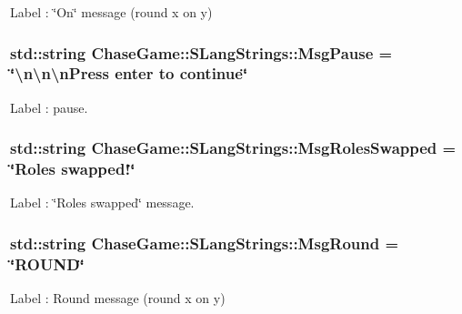 Label \-: \char`\"{}\-On\char`\"{} message (round x on y) 

\hypertarget{struct_chase_game_1_1_s_lang_strings_ad8e029116bf5c6ad81dd7e116195d5cc}{
\subsubsection[{Msg\-Pause}]{\setlength{\rightskip}{0pt plus 5cm}std\-::string Chase\-Game\-::\-S\-Lang\-Strings\-::\-Msg\-Pause = \char`\"{}\textbackslash{}n\textbackslash{}n\textbackslash{}n\-Press enter to continue\char`\"{}}}\label{struct_chase_game_1_1_s_lang_strings_ad8e029116bf5c6ad81dd7e116195d5cc}


Label \-: pause. 

\hypertarget{struct_chase_game_1_1_s_lang_strings_a7218940577aeae4cfb5f47bda05c88ce}{
\subsubsection[{Msg\-Roles\-Swapped}]{\setlength{\rightskip}{0pt plus 5cm}std\-::string Chase\-Game\-::\-S\-Lang\-Strings\-::\-Msg\-Roles\-Swapped = \char`\"{}Roles swapped!\char`\"{}}}\label{struct_chase_game_1_1_s_lang_strings_a7218940577aeae4cfb5f47bda05c88ce}


Label \-: \char`\"{}\-Roles swapped\char`\"{} message. 

\hypertarget{struct_chase_game_1_1_s_lang_strings_a637a94fa33b573cec57d98e6855c823f}{
\subsubsection[{Msg\-Round}]{\setlength{\rightskip}{0pt plus 5cm}std\-::string Chase\-Game\-::\-S\-Lang\-Strings\-::\-Msg\-Round = \char`\"{}R\-O\-U\-N\-D\char`\"{}}}\label{struct_chase_game_1_1_s_lang_strings_a637a94fa33b573cec57d98e6855c823f}


Label \-: Round message (round x on y) 


